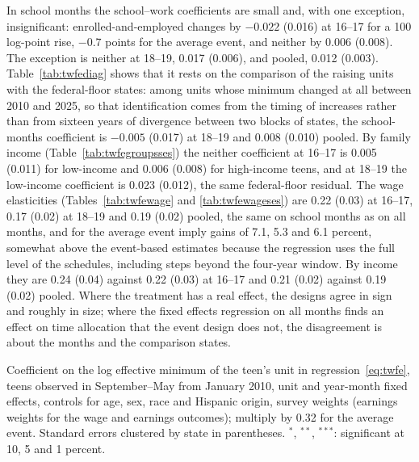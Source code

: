 \documentclass[12pt]{article}
\begin{document}
In school months the school--work coefficients are small and, with one exception, insignificant: enrolled-and-employed changes by $-0.022$ (0.016) at 16--17 for a 100 log-point rise, $-0.7$ points for the average event, and neither by 0.006 (0.008). The exception is neither at 18--19, 0.017 (0.006), and pooled, 0.012 (0.003). Table~\ref{tab:twfediag} shows that it rests on the comparison of the raising units with the federal-floor states: among units whose minimum changed at all between 2010 and 2025, so that identification comes from the timing of increases rather than from sixteen years of divergence between two blocks of states, the school-months coefficient is $-0.005$ (0.017) at 18--19 and 0.008 (0.010) pooled. By family income (Table~\ref{tab:twfegroupsses}) the neither coefficient at 16--17 is 0.005 (0.011) for low-income and 0.006 (0.008) for high-income teens, and at 18--19 the low-income coefficient is 0.023 (0.012), the same federal-floor residual. The wage elasticities (Tables~\ref{tab:twfewage} and \ref{tab:twfewageses}) are 0.22 (0.03) at 16--17, 0.17 (0.02) at 18--19 and 0.19 (0.02) pooled, the same on school months as on all months, and for the average event imply gains of 7.1, 5.3 and 6.1 percent, somewhat above the event-based estimates because the regression uses the full level of the schedules, including steps beyond the four-year window. By income they are 0.24 (0.04) against 0.22 (0.03) at 16--17 and 0.21 (0.02) against 0.19 (0.02) pooled. Where the treatment has a real effect, the designs agree in sign and roughly in size; where the fixed effects regression on all months finds an effect on time allocation that the event design does not, the disagreement is about the months and the comparison states.

\begin{table}[H]
\centering
\caption{Two-way fixed effects estimates for teen school--work status, school months, 2010--2026}
\label{tab:twfegroups}
\small

\begin{tablenotes}\footnotesize
\item Coefficient on the log effective minimum of the teen's unit in regression~\eqref{eq:twfe}, teens observed in September--May from January 2010, unit and year-month fixed effects, controls for age, sex, race and Hispanic origin, survey weights (earnings weights for the wage and earnings outcomes); multiply by 0.32 for the average event. Standard errors clustered by state in parentheses. $^{*}$, $^{**}$, $^{***}$: significant at 10, 5 and 1 percent.
\end{tablenotes}
\end{table}
\end{document}
